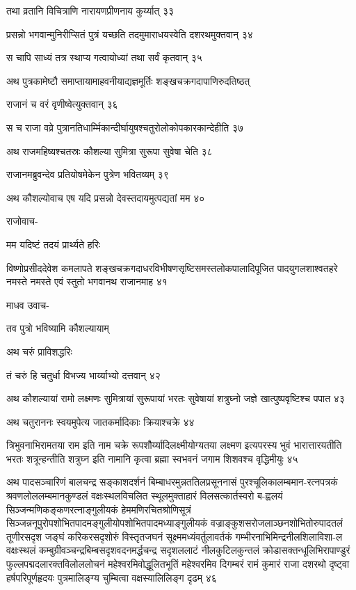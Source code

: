 तथा व्रतानि विचित्राणि नारायणप्रीणनाय कुर्य्यात् ३३

प्रसन्नो भगवान्मुनिरीप्सितं पुत्रं यच्छति तदमुमाराधयस्वेति दशरथमुक्तवान् ३४

स चापि साध्यं तत्र स्थाप्य गत्वायोध्यां तथा सर्वं कृतवान् ३५

अथ पुत्रकामेष्टौ समाप्तायामाहवनीयाद्यज्ञमूर्तिः शङ्खचक्रगदापाणिरुदतिष्ठत्

राजानं च वरं वृणीष्वेत्युक्तवान् ३६

स च राजा वव्रे पुत्रानतिधार्म्मिकान्दीर्घायुषश्चतुरोलोकोपकारकान्देहीति ३७

अथ राजमहिष्यश्चतस्रः कौशल्या सुमित्रा सुरूपा सुवेषा चेति ३८

राजानमब्रुवन्देव प्रतियोषमेकेन पुत्रेण भवितव्यम् ३९

अथ कौशल्योवाच एष यदि प्रसन्नो देवस्तदायमुत्पद्यतां मम ४०

राजोवाच-

मम यदिष्टं तदयं प्रार्थ्यते हरिः

विष्णोप्रसीददेवेश कमलापते शङ्खचक्रगदाधरविभीषणसृष्टिसमस्तलोकपालादिपूजित पादयुगलशाश्वतहरे
नमस्ते नमस्ते एवं स्तुतो भगवानथ राजानमाह ४१

माधव उवाच-

तव पुत्रो भविष्यामि कौशल्यायाम्

अथ चरुं प्राविशद्धरिः

तं चरुं हि चतुर्धा विभज्य भार्य्याभ्यो दत्तवान् ४२

अथ कौशल्यायां रामो लक्ष्मणः सुमित्रायां सुरूपायां भरतः सुवेषायां शत्रुघ्नो जज्ञे
खात्पुष्पवृष्टिश्च पपात ४३

अथ चतुराननः स्वयमुपेत्य जातकर्मादिकाः क्रियाश्चक्रे ४४

त्रिभुवनाभिरामतया राम इति नाम चक्रे रूपशौर्य्यादिलक्ष्मीयोग्यतया लक्ष्मण इत्यपरस्य भुवं
भारात्तारयतीति भरतः शत्रून्हन्तीति शत्रुघ्न इति नामानि कृत्वा ब्रह्मा स्वभवनं जगाम
शिशवश्च वृद्धिमीयुः ४५

अथ पादसञ्चारिणं बालचन्द्र सङ्काशदर्शनं बिम्बाधरमुन्नततिलप्रसूननासं पुरश्चूलिकालम्बमान-रत्नपत्रकं
श्रवणलोललम्बमानकुण्डलं वक्षःस्थलविचलित स्थूलमुक्ताहारं विलसत्कार्तस्वरो ब-ह्वलयं
सिञ्जन्मणिकङ्कणरत्नाङ्गुलीयकं हेममणिरचितश्रोणिसूत्रं
सिञ्जन्ननूपुरोपशोभितपादमङ्गुलीयोपशोभितपादमध्याङ्गुलीयकं वज्राङ्कुशसरोजलाञ्छनशोभितोरुपादतलं
तूणीरसदृश जङ्घं करिकरसदृशोरुं विस्तृतजघनं सूक्ष्ममध्यंवर्तुलावर्तकं
गम्भीरनाभिमिन्द्रनीलशिलाविशा-ल वक्षःस्थलं कम्बुग्रीवञ्चन्द्रबिम्बसदृशवदनमर्द्धचन्द्र सदृशललाटं
नीलकुटिलकुन्तलं क्रोडासक्तन्धूलिभिरापाण्डुरं फुल्लपद्मदलारक्तविलोललोचनं महेश्वरमिवोद्धूलितभूतिं
महेश्वरमिव दिगम्बरं रामं कुमारं राजा दशरथो दृष्ट्वा हर्षपरिपूर्णहृदयः पुत्रमालिङ्ग्य चुम्बित्वा
वक्षस्यालिलिङ्ग दृढम् ४६


